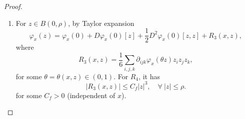 \begin{proof}
\begin{enumerate}[label=\Roman{*}.]
\begin{equation*}
        \end{equation*}
        Moreover, because $\xi$ is Gaussian, then
        \begin{equation*}
            \Pb(A^c_h) = \Pb \bc{|\xi| > {\rho}/{(2 \sqrt{h})}} \leq c_1 e^{-c_2/h},
        \end{equation*}
        for some $c_1,c_2 > 0$. Writing
        \begin{equation*}
            R^h f(x)=\mathbb{E}\left[\varphi_x\left(Z_h(x)\right) \mathbb{I}_{A_h}\right]+\mathbb{E}\left[f\left(\exp _x\left(Z_h(x)\right)\right) \mathbb{I}_{A_h^c}\right] .
        \end{equation*}
        Then for the second term,
        \begin{equation*}
            \abs{\mathbb{E}\left[f\left(\exp _x\left(Z_h(x)\right)\right) \mathbb{I}_{A_h^c}\right]} \leq \norm{f}_\infty \Pb(A^c_h) \leq \norm{f}_\infty c_1 e^{-c_2/h} \leq \mathcal{O}(h^2).
        \end{equation*}
        So the main goal is to bound the first term.

        \item For $z \in B(0,\rho)$, by Taylor expansion
        \begin{equation*}
            \varphi_x(z)=  \varphi_x(0)+D \varphi_x(0)[z]+\frac{1}{2} D^2 \varphi_x(0)[z, z]  +R_3(x,z),
        \end{equation*}
        where
        \begin{equation*}
            R_3(x,z)=\frac{1}{6} \sum_{i, j, k} \partial_{i j k} \varphi_x(\theta z) z_i z_j z_k,
        \end{equation*}
        for some $\theta=\theta(x, z) \in(0,1)$. For $R_4$, it has
        \begin{equation*}
            \left|R_3(x, z)\right| \leq C_f|z|^3, \quad \forall~|z| \leq \rho .
        \end{equation*}
        for some $C_f > 0$ (independent of $x$).


\end{enumerate}
\end{proof}
